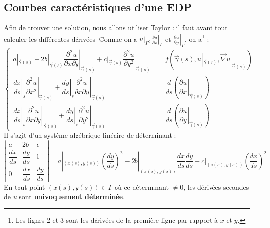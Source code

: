 \documentclass	[11pt, a4paper, openany]{book}
\begin{document}
				\subsection{Courbes caractéristiques d'une EDP}
				Afin de trouver une solution, nous allons utiliser Taylor : il faut avant tout calculer les différentes dérivées. Comme on a $u|_\Gamma, \left.\frac{\partial u}{\partial x}\right|_\Gamma$ et $\left.\frac{\partial u}{\partial y}\right|_\Gamma$, on a\footnote{Les lignes 2 et 3 sont les dérivées de la première ligne par rapport à $x$ et $y$.} :
				\begin{equation}
					\left\{\begin{array}{ll}
					a|_{\vec{\gamma}(s)} + 2b|_{\vec{\gamma}(s)}\left.\dfrac{\partial^2 u}{\partial x \partial y}\right|_{\vec{\gamma}(s)} + c|_{\vec{\gamma}(s)}\left.\dfrac{\partial^2u}{\partial y^2}\right|_{\vec{\gamma}(s)} &= f(\vec{\gamma}(s), u|_{\vec{\gamma}(s)}, \vec \nabla u|_{\vec{\gamma}(s)})\\
					\left.\dfrac{dx}{ds}\right|_{s}\left.\dfrac{\partial^2u}{\partial x^2}\right|_{\vec{\gamma}(s)} + \left.\dfrac{dy}{ds}\right|_{s}\left.\dfrac{\partial^2u}{\partial x\partial y}\right|_{\vec{\gamma}(s)} &= \dfrac{d}{ds}\left(\left.\dfrac{\partial u}{\partial x}\right|_{\vec{\gamma}(s)}\right)\\
					\left.\dfrac{dx}{ds}\right|_{s}\left.\dfrac{\partial^2u}{\partial x\partial y}\right|_{\vec{\gamma}(s)} + \left.\dfrac{dy}{ds}\right|_{s}\left.\dfrac{\partial^2u}{\partial y^2}\right|_{\vec{\gamma}(s)} &= \dfrac{d}{ds}\left(\left.\dfrac{\partial u}{\partial y}\right|_{\vec{\gamma}(s)}\right)
					\end{array}\right.
				\end{equation}
				Il s'agit d'un système algébrique linéaire de déterminant  :
				\begin{equation}
					\left|\begin{array}{ccc}
					a & 2b & c\\
					\dfrac{dx}{ds} & \dfrac{dy}{ds} & 0\\
					0 & \dfrac{dx}{ds} & \dfrac{dy}{ds}
					\end{array}\right| = a|_{(x(s),y(s))} \left(\dfrac{dy}{ds}\right)^2 - 2b|_{(x(s),y(s))} \dfrac{dx}{ds}\dfrac{dy}{ds} + c|_{(x(s),y(s))}\left(\dfrac{dx}{ds}\right)^2
				\end{equation}
				En tout point $(x(s),y(s)) \in \Gamma$ où ce déterminant $\neq 0$, les dérivées secondes de $u$ sont \textbf{univoquement déterminée}.\\
\end{document}
